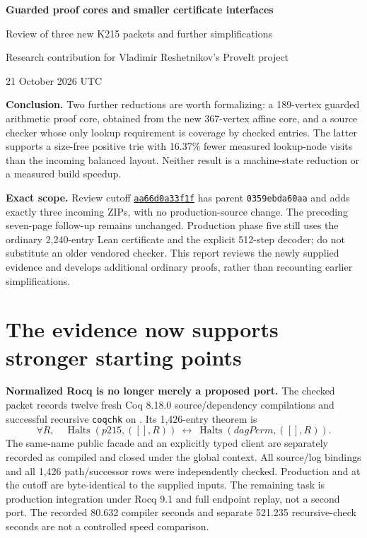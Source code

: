 \documentclass[11pt]{article}
\newcommand{\file}[1]{{\small\path{#1}}}
\newcommand{\code}[1]{\texttt{#1}}
\newcommand{\Halts}{\operatorname{Halts}}
\newcommand{\repo}{https://github.com/VladimirReshetnikov/ProveIt}
\newcommand{\cutoff}{aa66d0a33f1f8237a348899eb8095b045a502832}
\begin{document}
\begin{center}
{\LARGE\bfseries Guarded proof cores and smaller certificate interfaces}\par\vspace{7pt}
{\large Review of three new K215 packets and further simplifications}\par\vspace{4pt}
{Research contribution for Vladimir Reshetnikov's ProveIt project}\par
{21 October 2026 UTC}
\end{center}

\textbf{Conclusion.} Two further reductions are worth formalizing: a 189-vertex guarded arithmetic proof core, obtained from the new 367-vertex affine core, and a source checker whose only lookup requirement is coverage by checked entries. The latter supports a size-free positive trie with 16.37\% fewer measured lookup-node visits than the incoming balanced layout. Neither result is a machine-state reduction or a measured build speedup.

\textbf{Exact scope.} Review cutoff
\href{\repo/commit/\cutoff}{\code{aa66d0a33f1f}}
has parent \code{0359ebda60aa} and adds exactly three incoming ZIPs, with no production-source change. The preceding seven-page follow-up remains unchanged. Production phase five still uses the ordinary 2,240-entry Lean certificate and the explicit 512-step decoder; do not substitute an older vendored checker. This report reviews the newly supplied evidence and develops additional ordinary proofs, rather than recounting earlier simplifications.

\section{The evidence now supports stronger starting points}
\textbf{Normalized Rocq is no longer merely a proposed port.} The checked packet records twelve fresh Coq 8.18.0 source/dependency compilations and successful recursive \code{coqchk} on \file{NormalizedSource215}. Its 1,426-entry theorem is
\[
 \forall R,\quad \Halts(p215,([],R))\ \longleftrightarrow\
 \Halts(dagPerm,([],R)).
\]
The same-name public facade and an explicitly typed client are separately recorded as compiled and closed under the global context. All source/log bindings and all 1,426 path/successor rows were independently checked. Production \file{Prog215.v} and \file{DagPerm.v} at the cutoff are byte-identical to the supplied inputs. The remaining task is production integration under Rocq 9.1 and full endpoint replay, not a second port. The recorded 80.632 compiler seconds and separate 521.235 recursive-check seconds are not a controlled speed comparison.
\end{document}
